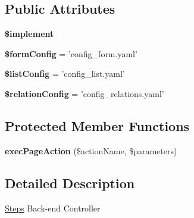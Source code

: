 \subsection*{Public Attributes}
\begin{DoxyCompactItemize}
\item 
{\bfseries \$implement}
\item 
\hypertarget{classDMA_1_1Friends_1_1Controllers_1_1Groups_a6eecdf56ed0bb93cd693c06aa945a87b}{{\bfseries \$form\-Config} = 'config\-\_\-form.\-yaml'}\label{classDMA_1_1Friends_1_1Controllers_1_1Groups_a6eecdf56ed0bb93cd693c06aa945a87b}

\item 
\hypertarget{classDMA_1_1Friends_1_1Controllers_1_1Groups_a8cae966221f95dfbba825e1ffde46049}{{\bfseries \$list\-Config} = 'config\-\_\-list.\-yaml'}\label{classDMA_1_1Friends_1_1Controllers_1_1Groups_a8cae966221f95dfbba825e1ffde46049}

\item 
\hypertarget{classDMA_1_1Friends_1_1Controllers_1_1Groups_a1dee3b5ab935f5c8b420f03d4d17f536}{{\bfseries \$relation\-Config} = 'config\-\_\-relations.\-yaml'}\label{classDMA_1_1Friends_1_1Controllers_1_1Groups_a1dee3b5ab935f5c8b420f03d4d17f536}

\end{DoxyCompactItemize}
\subsection*{Protected Member Functions}
\begin{DoxyCompactItemize}
\item 
\hypertarget{classDMA_1_1Friends_1_1Controllers_1_1Groups_acbcf411c50f7345b942c70aa9ebc8070}{{\bfseries exec\-Page\-Action} (\$action\-Name, \$parameters)}\label{classDMA_1_1Friends_1_1Controllers_1_1Groups_acbcf411c50f7345b942c70aa9ebc8070}

\end{DoxyCompactItemize}


\subsection{Detailed Description}
\hyperlink{classDMA_1_1Friends_1_1Controllers_1_1Steps}{Steps} Back-\/end Controller 

